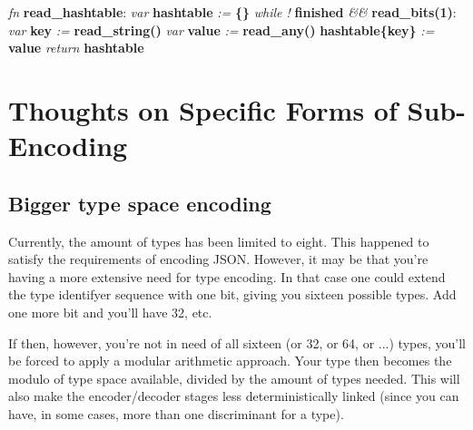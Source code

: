 \begin{changemargin}{-60mm}{0mm}
\begin{myquote}

\vbox{
\textit{fn} \textbf{read\_hashtable}: \newline
\indent\hspace{.5cm} \textit{var} \textbf{hashtable} \textit{:=} \textbf{\{\}} \newline
\indent\hspace{.5cm} \textit{while !} \textbf{finished} \textit{\&\&} \textbf{read\_bits(1)}: \newline
\indent\hspace{1cm} \textit{var} \textbf{key} \textit{:=} \textbf{read\_string()} \newline
\indent\hspace{1cm} \textit{var} \textbf{value} \textit{:=} \textbf{read\_any()} \newline
\indent\hspace{1cm} \textbf{hashtable\{key\}} \textit{:=} \textbf{value} \newline
\indent\hspace{.5cm} \textit{return} \textbf{hashtable} \newline
}

\end{myquote}
\end{changemargin}

\section{Thoughts on Specific Forms of Sub-Encoding}

\subsection{Bigger type space encoding}

Currently, the amount of types has been limited to eight. This happened
to satisfy the requirements of encoding JSON. However, it may be that you're
having a more extensive need for type encoding. In that case one could
extend the type identifyer sequence with one bit, giving you sixteen
possible types. Add one more bit and you'll have 32, etc.

If then, however, you're not in need of all sixteen (or 32, or 64, or ...)
types, you'll be forced to apply a modular arithmetic approach. Your type then
becomes the modulo of type space available, divided by the amount of
types needed. This will also make the encoder/decoder stages less
deterministically linked (since you can have, in some cases, more than
one discriminant for a type).

